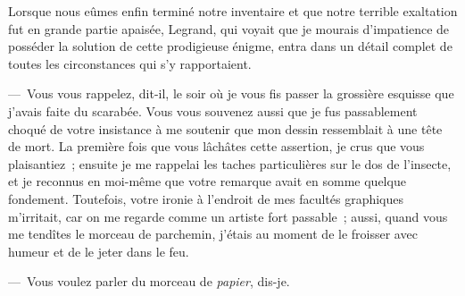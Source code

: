 \documentclass[french,twoside]{book} %
\begin{document}
Lorsque nous eûmes enfin terminé notre inventaire et que notre terrible exaltation fut en grande partie apaisée, Legrand, qui voyait que je mourais d’impatience de posséder la solution de cette prodigieuse énigme, entra dans un détail complet de toutes les circonstances qui s’y rapportaient.\par
— Vous vous rappelez, dit-il, le soir où je vous fis passer la grossière esquisse que j’avais faite du scarabée. Vous vous souvenez aussi que je fus passablement choqué de votre insistance à me soutenir que mon dessin ressemblait à une tête de mort. La première fois que vous lâchâtes cette assertion, je crus que vous plaisantiez ; ensuite je me rappelai les taches particulières sur le dos de l’insecte, et je reconnus en moi-même que votre remarque avait en somme quelque fondement. Toutefois, votre ironie à l’endroit de mes facultés graphiques m’irritait, car on me regarde comme un artiste fort passable ; aussi, quand vous me tendîtes le morceau de parchemin, j’étais au moment de le froisser avec humeur et de le jeter dans le feu.\par
— Vous voulez parler du morceau de \emph{papier}, dis-je.\par
\end{document}
